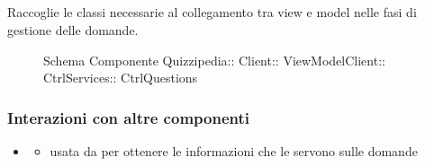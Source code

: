\subsection{}
Raccoglie le classi necessarie al collegamento tra view e model nelle fasi di gestione delle domande.
\begin{figure}[H]
\centering
\noindent{}
\caption[Schema Componente CtrlQuestions]{Schema Componente Quizzipedia:: Client:: ViewModelClient:: CtrlServices:: CtrlQuestions}
\end{figure}
\subsubsection{Interazioni con altre componenti}
\begin{itemize}
\item {}
\begin{itemize}
\item usata da  per ottenere le informazioni che le servono sulle domande
\end{itemize}
\end{itemize}
